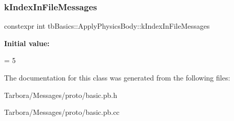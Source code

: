 \subsubsection{\texorpdfstring{k\+Index\+In\+File\+Messages}{kIndexInFileMessages}}
{\footnotesize\ttfamily constexpr int tb\+Basics\+::\+Apply\+Physics\+Body\+::k\+Index\+In\+File\+Messages\hspace{0.3cm}{\ttfamily [static]}}

{\bfseries Initial value\+:}
\begin{DoxyCode}
=
    5
\end{DoxyCode}


The documentation for this class was generated from the following files\+:\begin{DoxyCompactItemize}
\item 
Tarbora/\+Messages/proto/basic.\+pb.\+h\item 
Tarbora/\+Messages/proto/basic.\+pb.\+cc\end{DoxyCompactItemize}
